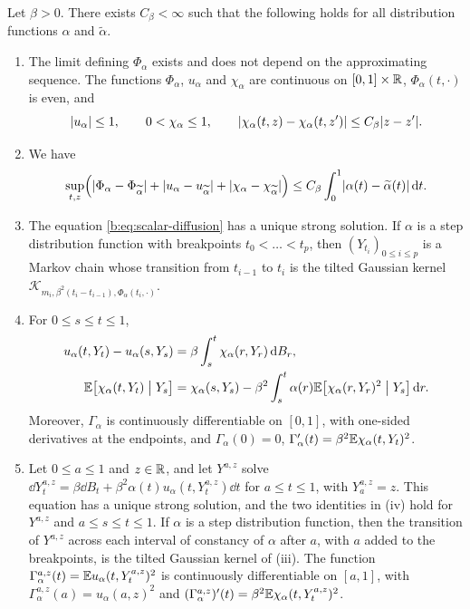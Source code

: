 \begin{proposition}\label{inp:ob-scalar}
Let $\beta>0$. There exists $C_\beta<\infty$ such that the following holds for
all distribution functions $\alpha$ and $\widetilde\alpha$.
\begin{enumerate}[label=\textup{(\roman*)}]
\item The limit defining $\Phi_\alpha$ exists and does not depend on the
 approximating sequence. The functions $\Phi_\alpha$, $u_\alpha$ and
 $\chi_\alpha$ are continuous on $[0,1]\times\mathbb R$, $\Phi_\alpha(t,\cdot)$ is
 even, and
 \[
  \lvert u_\alpha\rvert\le1,\qquad 0<\chi_\alpha\le1,\qquad
  \lvert \chi_\alpha(t,z)-\chi_\alpha(t,z')\rvert\le C_\beta\lvert z-z'\rvert.
 \]
\item We have
 \[
  \sup_{t,z}\Bigl(\lvert \Phi_\alpha-\Phi_{\widetilde\alpha}\rvert
  +\lvert u_\alpha-u_{\widetilde\alpha}\rvert+\lvert \chi_\alpha-\chi_{\widetilde\alpha}\rvert\Bigr)
  \le C_\beta\int_0^1\lvert \alpha(t)-\widetilde\alpha(t)\rvert\,\mathrm d t.
 \]
\item The equation \eqref{b:eq:scalar-diffusion} has a unique strong solution. If
 $\alpha$ is a step distribution function with breakpoints $t_0<\dots<t_p$, then
 $(Y_{t_i})_{0\le i\le p}$ is a Markov chain whose transition from $t_{i-1}$ to
 $t_i$ is the tilted Gaussian kernel
 $\mathcal K_{m_i,\beta^2(t_i-t_{i-1}),\Phi_\alpha(t_i,\cdot)}$.
\item For $0\le s\le t\le1$,
 \begin{align*}
  u_\alpha(t,Y_t)-u_\alpha(s,Y_s)&=\beta\int_s^t\chi_\alpha(r,Y_r)\,\mathrm d B_r,\\
  \mathbb E\bigl[\chi_\alpha(t,Y_t)\bigm| Y_s\bigr]&=\chi_\alpha(s,Y_s)
   -\beta^2\int_s^t\alpha(r)\mathbb E\bigl[\chi_\alpha(r,Y_r)^2\bigm| Y_s\bigr]\,\mathrm d r.
 \end{align*}
 Moreover, $\Gamma_\alpha$ is continuously differentiable on $[0,1]$, with
 one-sided derivatives at the endpoints, and
 $\Gamma_\alpha(0)=0$, $\Gamma_\alpha'(t)=\beta^2\mathbb E\chi_\alpha(t,Y_t)^2$.
\item Let $0\le a\le1$ and $z\in\mathbb R$, and let $Y^{a,z}$ solve
 $\dd Y^{a,z}_t=\beta\dd B_t+\beta^2\alpha(t)u_\alpha(t,Y^{a,z}_t)\dd t$ for
 $a\le t\le1$, with $Y^{a,z}_a=z$. This equation has a unique strong solution,
 and the two identities in \textup{(iv)} hold for $Y^{a,z}$ and $a\le s\le t\le1$.
 If $\alpha$ is a step distribution function, then the transition of $Y^{a,z}$
 across each interval of constancy of $\alpha$ after $a$, with $a$ added to the
 breakpoints, is the tilted Gaussian kernel of \textup{(iii)}. The function
 $\Gamma^{a,z}_\alpha(t)=\mathbb E u_\alpha(t,Y^{a,z}_t)^2$ is continuously
 differentiable on $[a,1]$, with $\Gamma^{a,z}_\alpha(a)=u_\alpha(a,z)^2$ and
 $(\Gamma^{a,z}_\alpha)'(t)=\beta^2\mathbb E\chi_\alpha(t,Y^{a,z}_t)^2$.
\end{enumerate}
\end{proposition}

